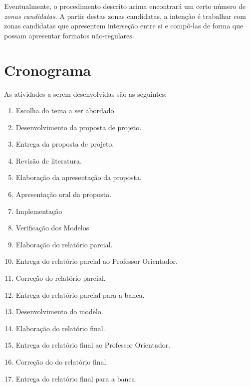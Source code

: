 \documentclass[
	12pt,				%
	openright,			%
	twoside,			%
	a4paper,			%
	english,			%
	french,				%
	spanish,			%
	brazil,				%
	]{abntex2}
\begin{document}
Eventualmente, o procedimento descrito acima encontrará um certo número de \textit{zonas candidatas}. A partir destas zonas candidatas, a intenção é trabalhar com zonas candidatas que apresentem interseção entre si e compô-las de forma que possam apresentar formatos não-regulares.

\chapter{Cronograma}
\label{chap:crono}

As atividades a serem desenvolvidas são as seguintes:

\begin{enumerate}
	\item \label{etapa1} Escolha do tema a ser abordado.
	\item \label{etapa2} Desenvolvimento da proposta de projeto.
	\item \label{etapa3} Entrega da proposta de projeto.
	\item \label{etapa4} Revisão de literatura.
	\item \label{etapa5} Elaboração da apresentação da proposta.
	\item \label{etapa6} Apresentação oral da proposta.
	\item \label{etapa7} Implementação
    \item \label{etapa8} Verificação dos Modelos
	\item \label{etapa9} Elaboração do relatório parcial.
	\item \label{etapa10} Entrega do relatório parcial ao Professor Orientador.
	\item \label{etapa11} Correção do relatório parcial.
	\item \label{etapa12} Entrega do relatório parcial para a banca.
	\item \label{etapa13} Desenvolvimento do modelo.
    \item \label{etapa14} Elaboração do relatório final.
	\item \label{etapa15} Entrega do relatório final ao Professor Orientador.
	\item \label{etapa16} Correção do do relatório final.
	\item \label{etapa17} Entrega do relatório final para a banca.
\end{enumerate}
\end{document}
